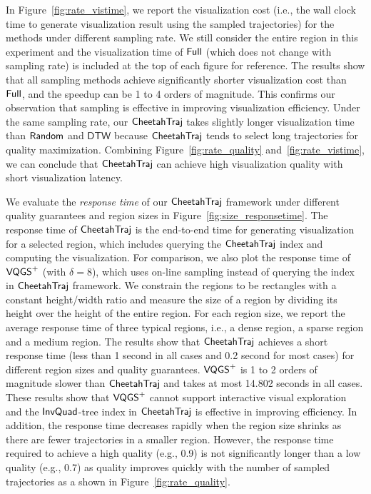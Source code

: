 In Figure~\ref{fig:rate_vistime}, we report the visualization cost (i.e., the wall clock time to generate visualization result using the sampled trajectories) for the methods under different sampling rate.
We still consider the entire region in this experiment and the visualization time of $\mathsf{Full}$ (which does not change with sampling rate) is included at the top of each figure for reference.
The results show that all sampling methods achieve significantly shorter visualization cost than $\mathsf{Full}$, and the speedup can be 1 to 4 orders of magnitude.
This confirms our observation that sampling is effective in improving visualization efficiency.
Under the same sampling rate, our $\mathsf{CheetahTraj}$ takes slightly longer visualization time than $\mathsf{Random}$ and $\mathsf{DTW}$
because $\mathsf{CheetahTraj}$ tends to select long trajectories for quality maximization.
Combining Figure~\ref{fig:rate_quality} and~\ref{fig:rate_vistime}, we can conclude that $\mathsf{CheetahTraj}$ can achieve high visualization quality with  short visualization latency.


We evaluate the \textit{response time} of our $\mathsf{CheetahTraj}$ framework under different quality guarantees and region sizes in Figure~\ref{fig:size_responsetime}.
The response time of $\mathsf{CheetahTraj}$ is the end-to-end time for generating visualization for a selected region, which includes querying the $\mathsf{CheetahTraj}$ index and computing the visualization.
For comparison, we also plot the response time of $\mathsf{VQGS}^+$ (with $\delta\!=\!8$), which uses on-line sampling instead of querying the index in $\mathsf{CheetahTraj}$ framework.
We constrain the regions to be rectangles with a constant height/width ratio and measure the size of a region by dividing its height over the height of the entire region.
For each region size, we report the average response time of three typical regions, i.e., a dense region, a sparse region and a medium region.
The results show that $\mathsf{CheetahTraj}$ achieves a short response time (less than 1 second in all cases and 0.2 second for most cases) for different region sizes and quality guarantees. $\mathsf{VQGS}^+$ is 1 to 2 orders of magnitude slower than $\mathsf{CheetahTraj}$ and takes at most 14.802 seconds in all cases. These results show that $\mathsf{VQGS}^+$ cannot support interactive visual exploration and the $\mathsf{InvQuad}$-tree index in $\mathsf{CheetahTraj}$ is effective in improving efficiency.
In addition, the response time decreases rapidly when the region size shrinks as there are fewer trajectories in a smaller region.
However, the response time required to achieve a high quality (e.g., 0.9) is not significantly longer than a low quality (e.g., 0.7) as quality improves quickly with the number of sampled trajectories as a shown in Figure~\ref{fig:rate_quality}.





